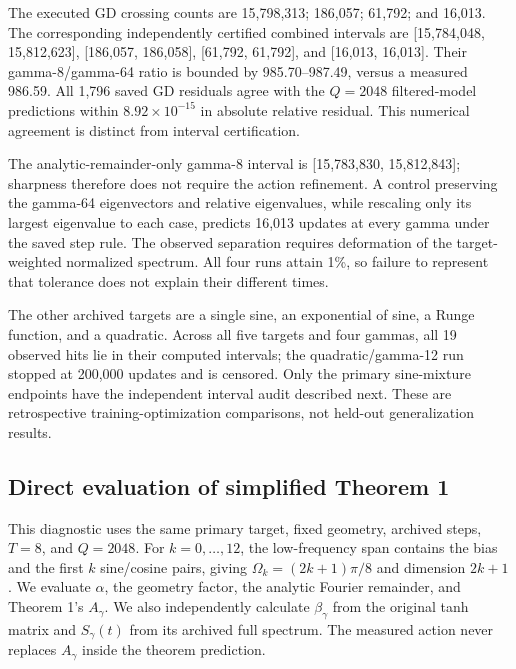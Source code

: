 \documentclass[11pt]{article}
\theoremstyle{definition}
\begin{document}
The executed GD crossing counts are 15,798,313; 186,057; 61,792; and 16,013.
The corresponding independently certified combined intervals are
[15,784,048, 15,812,623], [186,057, 186,058], [61,792, 61,792], and
[16,013, 16,013]. Their gamma-8/gamma-64 ratio is bounded by
985.70--987.49, versus a measured 986.59. All 1,796 saved GD residuals agree
with the $Q=2048$ filtered-model predictions within $8.92\times10^{-15}$ in
absolute relative residual. This numerical agreement is distinct from
interval certification.

The analytic-remainder-only gamma-8 interval is [15,783,830, 15,812,843];
sharpness therefore does not require the action refinement. A control
preserving the gamma-64 eigenvectors and relative eigenvalues, while
rescaling only its largest eigenvalue to each case, predicts 16,013 updates
at every gamma under the saved step rule. The observed separation requires
deformation of the target-weighted normalized spectrum. All four runs attain
1\%, so failure to represent that tolerance does not explain their different times.

The other archived targets are a single sine, an exponential of sine, a
Runge function, and a quadratic. Across all five targets and four gammas,
all 19 observed hits lie in their computed intervals; the quadratic/gamma-12
run stopped at 200,000 updates and is censored. Only the primary sine-mixture
endpoints have the independent interval audit described next. These are
retrospective training-optimization comparisons, not held-out generalization results.

\subsection*{Direct evaluation of simplified Theorem 1}
This diagnostic uses the same primary target, fixed geometry, archived steps,
$T=8$, and $Q=2048$. For $k=0,\ldots,12$, the low-frequency span contains the
bias and the first $k$ sine/cosine pairs, giving $\Omega_k=(2k+1)\pi/8$ and
dimension $2k+1$. We evaluate $\alpha$, the geometry factor, the analytic
Fourier remainder, and Theorem 1's $A_\gamma$. We also independently calculate
$\beta_\gamma$ from the original tanh matrix and $S_\gamma(t)$ from its
archived full spectrum. The measured action never replaces $A_\gamma$
inside the theorem prediction.
\end{document}
